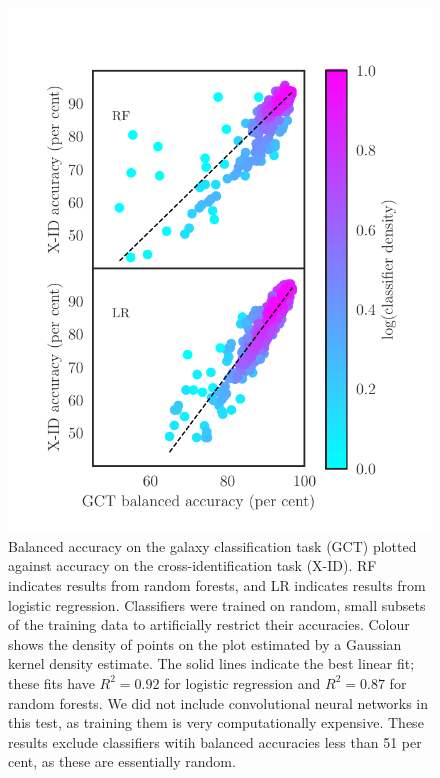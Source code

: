 \documentclass[fleqn,usenatbib,usedcolumn]{mnras}
\begin{document}
    \begin{figure}
      \centering
      \includegraphics[width=\columnwidth]{images/gct-to-xid.pdf}
      \caption{Balanced accuracy on the galaxy classification task (GCT) plotted
      against accuracy on the cross-identification task (X-ID). RF indicates
      results from random forests, and LR indicates results from logistic
      regression. Classifiers were trained on random, small subsets of the
      training data to artificially restrict their accuracies. Colour shows
      the density of points on the plot estimated by a Gaussian kernel density
      estimate. The solid lines indicate the best linear fit; these fits have
      $R^2 = 0.92$ for logistic regression and $R^2 = 0.87$ for random
      forests. We did not include convolutional neural networks in this test,
      as training them is very computationally expensive. These results
      exclude classifiers witih balanced accuracies less than 51 per cent, as
      these are essentially random.
      \label{fig:gct-to-xid}}
    \end{figure}
  
\end{document}
